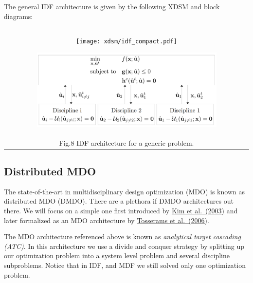\documentclass[11pt]{article}
\begin{document}
The general IDF architecture is given by the following XDSM and block
diagrams:

\begin{longtable}[]{@{}c@{}}
    \toprule
    \endhead
    \begin{minipage}[t]{0.97\columnwidth}\centering
        \begin{figure}
            \centering
            \texttt{[image: xdsm/idf\_compact.pdf]}
        \end{figure}
        \begin{figure}
            \centering
            \includegraphics[width=0.9\textwidth]{images/IDF_diagram.png}
        \end{figure}
    \end{minipage}\tabularnewline
    Fig.8 IDF architecture for a generic problem.\tabularnewline
    \bottomrule
\end{longtable}

    \hypertarget{distributed-mdo}{%
\subsection{Distributed MDO}\label{distributed-mdo}}

The state-of-the-art in multidisciplinary design optimization (MDO) is
known as distributed MDO (DMDO). There are a plethora if DMDO
architectures out there. We will focus on a simple one first introduced
by
\href{https://asmedigitalcollection.asme.org/mechanicaldesign/article-abstract/125/3/481/476066/Analytical-Target-Cascading-in-Automotive-Vehicle?redirectedFrom=fulltext}{Kim
et al.~(2003)} and later formalized as an MDO architecture by
\href{https://link.springer.com/article/10.1007/s00158-005-0579-0}{Tosserams
et al.~(2006)}.

The MDO architecture referenced above is known as \emph{analytical
target cascading (ATC)}. In this architecture we use a divide and
conquer strategy by splitting up our optimization problem into a system
level problem and several discipline subproblems. Notice that in IDF,
and MDF we still solved only one optimization problem.
\end{document}
